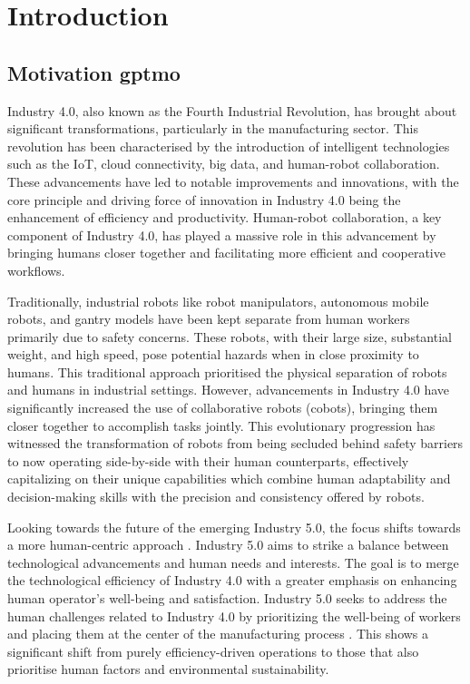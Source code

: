 \chapter{Introduction}
\label{aufbau}

\section{Motivation \gls*{gptmo}} 

Industry 4.0, also known as the Fourth Industrial Revolution, has brought about significant transformations, particularly in the manufacturing sector. This revolution has been characterised by the introduction of intelligent technologies such as the \gls{IoT}, cloud connectivity, big data, and human-robot collaboration. These advancements have led to notable improvements and innovations, with the core principle and driving force of innovation in Industry 4.0 being the enhancement of efficiency and productivity. Human-robot collaboration, a key component of Industry 4.0, has played a massive role in this advancement by bringing humans closer together and facilitating more efficient and cooperative workflows. 

Traditionally, industrial robots like robot manipulators, autonomous mobile robots, and gantry models have been kept separate from human workers primarily due to safety concerns. These robots, with their large size, substantial weight, and high speed, pose potential hazards when in close proximity to humans. This traditional approach prioritised the physical separation of robots and humans in industrial settings. However, advancements in Industry 4.0 have significantly increased the use of collaborative robots (cobots), bringing them closer together to accomplish tasks jointly. This evolutionary progression has witnessed the transformation of robots from being secluded behind safety barriers to now operating side-by-side with their human counterparts, effectively capitalizing on their unique capabilities which combine human adaptability and decision-making skills with the precision and consistency offered by robots.  

Looking towards the future of the emerging Industry 5.0, the focus shifts towards a more human-centric approach \parencite{industry5}. Industry 5.0 aims to strike a balance between technological advancements and human needs and interests. The goal is to merge the technological efficiency of Industry 4.0 with a greater emphasis on enhancing human operator's well-being and satisfaction.
Industry 5.0 seeks to address the human challenges related to Industry 4.0 by prioritizing the well-being of workers and placing them at the center of the manufacturing process \parencite{hum1}.
This shows a significant shift from purely efficiency-driven operations to those that also prioritise human factors and environmental sustainability. 

